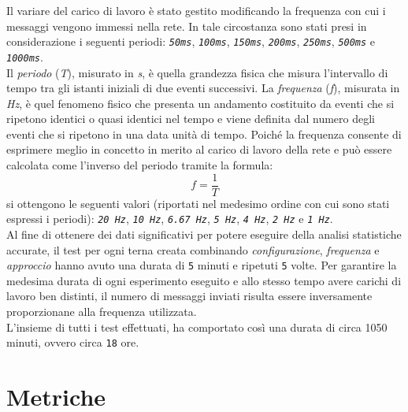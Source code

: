 \noindent Il variare del carico di lavoro è stato gestito modificando la frequenza con cui i messaggi vengono immessi nella rete.
In tale circostanza sono stati presi in considerazione i seguenti periodi: \texttt{\textit{50ms}}, \texttt{\textit{100ms}}, \texttt{\textit{150ms}}, \texttt{\textit{200ms}}, \texttt{\textit{250ms}}, \texttt{\textit{500ms}} e \texttt{\textit{1000ms}}.\\
Il \textit{periodo} (\textit{T}), misurato in \textit{s}, è quella grandezza fisica che misura l'intervallo di tempo tra gli istanti iniziali di due eventi successivi.
La \textit{frequenza} (\textit{f}), misurata in \textit{Hz}, è quel fenomeno fisico che presenta un andamento costituito da eventi che si ripetono identici o quasi identici nel tempo e viene definita dal numero degli eventi che si ripetono in una data unità di tempo. Poiché la frequenza consente di esprimere meglio in concetto in merito al carico di lavoro della rete e può essere calcolata come l'inverso del periodo tramite la formula:
$$ f = \frac{1}{T} $$
si ottengono le seguenti valori (riportati nel medesimo ordine con cui sono stati espressi i periodi): \texttt{\textit{20 Hz}}, \texttt{\textit{10 Hz}}, \texttt{\textit{6.67 Hz}}, \texttt{\textit{5 Hz}}, \texttt{\textit{4 Hz}}, \texttt{\textit{2 Hz}} e \texttt{\textit{1 Hz}}.\\


\noindent Al fine di ottenere dei dati significativi per potere eseguire della analisi statistiche accurate, il test per ogni terna creata combinando \textit{configurazione}, \textit{frequenza} e \textit{approccio} hanno avuto una durata di \texttt{5} minuti e ripetuti \texttt{5} volte. Per garantire la medesima durata di ogni esperimento eseguito e allo stesso tempo avere carichi di lavoro ben distinti, il numero di messaggi inviati risulta essere inversamente proporzionane alla frequenza utilizzata.\\

\noindent L'insieme di tutti i test effettuati, ha comportato così una durata di circa 1050 minuti, ovvero circa \texttt{18} ore.

\section{Metriche}

